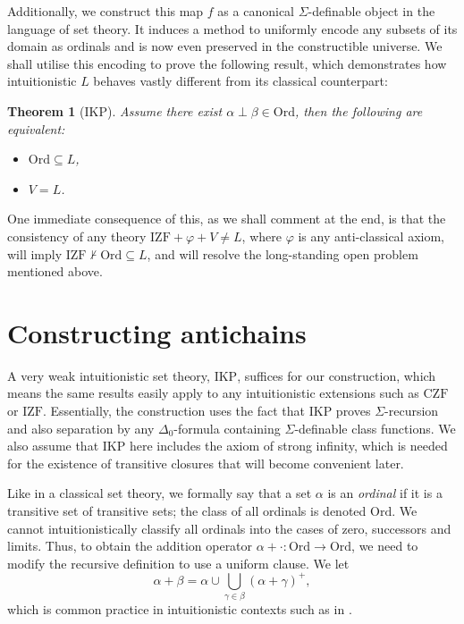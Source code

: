 \documentclass{asl}
\theoremstyle{plain}
\newtheorem{theorem}{Theorem}
\newcommand{\Ord}{\mathrm{Ord}}
\begin{document}
Additionally, we construct this map $f$ as a canonical $\Sigma$-definable object in the language of set theory. It induces a method to uniformly encode any subsets of its domain as ordinals and is now even preserved in the constructible universe. We shall utilise this encoding to prove the following result, which demonstrates how intuitionistic $L$ behaves vastly different from its classical counterpart:

\begin{theorem}[$\mathrm{IKP}$]
  \label{thm:main-equiv}
  Assume there exist $\alpha \perp \beta \in \Ord$, then the following are equivalent:
  \begin{itemize}
    \item $\Ord \subseteq L$,
    \item $V = L$.
  \end{itemize}
\end{theorem}

One immediate consequence of this, as we shall comment at the end, is that the consistency of any theory $\mathrm{IZF} + \varphi + V \neq L$, where $\varphi$ is any anti-classical axiom, will imply $\mathrm{IZF} \nvdash \Ord \subseteq L$, and will resolve the long-standing open problem mentioned above.

\section{Constructing antichains}

A very weak intuitionistic set theory, $\mathrm{IKP}$, suffices for our construction, which means the same results easily apply to any intuitionistic extensions such as $\mathrm{CZF}$ or $\mathrm{IZF}$.  Essentially, the construction uses the fact that $\mathrm{IKP}$ proves $\Sigma$-recursion and also separation by any $\Delta_0$-formula containing $\Sigma$-definable class functions. We also assume that $\mathrm{IKP}$ here includes the axiom of strong infinity, which is needed for the existence of transitive closures that will become convenient later.

Like in a classical set theory, we formally say that a set $\alpha$ is an \emph{ordinal} if it is a transitive set of transitive sets; the class of all ordinals is denoted $\Ord$. We cannot intuitionistically classify all ordinals into the cases of zero, successors and limits. Thus, to obtain the addition operator $\alpha + \cdot : \Ord \rightarrow \Ord$, we need to modify the recursive definition to use a uniform clause. We let
\[\alpha + \beta = \alpha \cup \bigcup_{\gamma \in \beta} \left(\alpha + \gamma\right)^+,\]
which is common practice in intuitionistic contexts such as in \cite{aczel-rathjen10-cst-book}.
\end{document}
